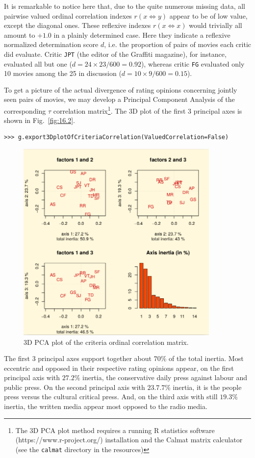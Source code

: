 It is remarkable to notice here that, due to the quite numerous missing data, all pairwise valued ordinal correlation indexes $r(x\Leftrightarrow y)$ appear to be of low value, except the diagonal ones. These reflexive indexes $r(x\Leftrightarrow x)$ would trivially all amount to $+1.0$ in a plainly determined case. Here they indicate a reflexive normalized determination score $d$, i.e. the proportion of pairs of movies each critic did evaluate. Critic \texttt{JPT} (the editor of the Graffiti magazine), for instance, evaluated all but one ($d = 24\times23/600 = 0.92$), whereas critic \texttt{FG} evaluated only 10 movies among the 25 in discussion ($d = 10\times9/600 = 0.15$).

To get a picture of the actual divergence of rating opinions concerning jointly seen pairs of movies, we may develop a Principal Component Analysis of the corresponding $\tau$ correlation matrix\footnote{The 3D PCA plot method requires a running R statistics software  (https://www.r-project.org/) installation and the Calmat matrix calculator (see the \texttt{calmat} directory in the \Digraph resources)}. The 3D plot of the first 3 principal axes is shown in Fig.~\vref{fig:16.2}.
\begin{lstlisting}
>>> g.export3DplotOfCriteriaCorrelation(ValuedCorrelation=False)
\end{lstlisting}
\begin{figure}[h]
\includegraphics[width=10cm]{Figures/correlationPCA.png}
\caption{3D PCA plot of the criteria ordinal correlation matrix.}
\label{fig:16.7}       %
\end{figure}
The first 3 principal axes support together about $70\%$ of the total inertia. Most eccentric and opposed in their respective rating opinions appear, on the first principal axis with $27.2\%$ inertia, the conservative daily press against labour and public press. On the second principal axis with $23.7.7\%$ inertia, it is the people press versus the cultural critical press. And, on the third axis with still $19.3\%$ inertia, the written media appear most opposed to the radio media.

